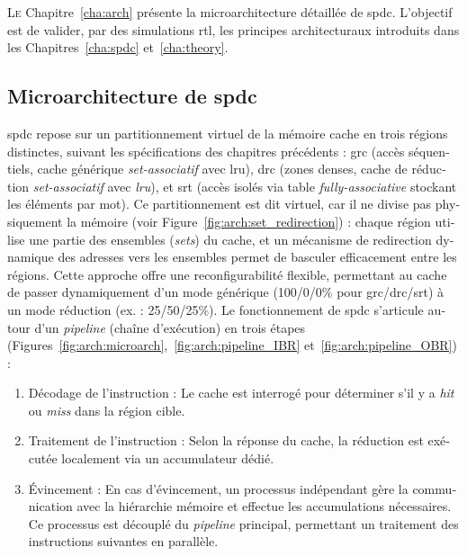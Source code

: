 \begin{otherlanguage}{french}
\lettrine{L}{e} Chapitre~\ref{cha:arch} présente la microarchitecture détaillée de \acrlong{spdc}.
L'objectif est de valider, par des simulations \acrshort{rtl}, les principes architecturaux introduits dans les Chapitres~\ref{cha:spdc} et~\ref{cha:theory}.

\subsection*{Microarchitecture de \acrlong{spdc}}

\acrlong{spdc} repose sur un partitionnement virtuel de la mémoire cache en trois régions distinctes, suivant les spécifications des chapitres précédents : \acrshort{grc} (accès séquentiels, cache générique \textit{set-associatif} avec \acrshort{lru}), \acrshort{drc} (zones denses, cache de réduction \textit{set-associatif} avec \textit{lru}), et \acrshort{srt} (accès isolés via table \textit{fully-associative} stockant les éléments par mot).
Ce partitionnement est dit virtuel, car il ne divise pas physiquement la mémoire (voir Figure~\ref{fig:arch:set_redirection}) : chaque région utilise une partie des ensembles (\textit{sets}) du cache, et un mécanisme de redirection dynamique des adresses vers les ensembles permet de basculer efficacement entre les régions.
Cette approche offre une reconfigurabilité flexible, permettant au cache de passer dynamiquement d'un mode générique (100/0/0\% pour \acrshort{grc}/\acrshort{drc}/\acrshort{srt}) à un mode réduction (ex. : 25/50/25\%).
Le fonctionnement de \acrlong{spdc} s'articule autour d'un \textit{\gls{pipeline}} (chaîne d'exécution) en trois étapes (Figures~\ref{fig:arch:microarch},~\ref{fig:arch:pipeline_IBR} et~\ref{fig:arch:pipeline_OBR}) :
\begin{enumerate}
    \item Décodage de l'instruction : Le cache est interrogé pour déterminer s'il y a \textit{\gls{hit}} ou \textit{\gls{miss}} dans la région cible.
    \item Traitement de l'instruction : Selon la réponse du cache, la réduction est exécutée localement via un accumulateur dédié.
    \item \'Evincement : En cas d'évincement, un processus indépendant gère la communication avec la hiérarchie mémoire et effectue les accumulations nécessaires.
    Ce processus est découplé du \textit{\gls{pipeline}} principal, permettant un traitement des instructions suivantes en parallèle.
\end{enumerate}


\end{otherlanguage}
